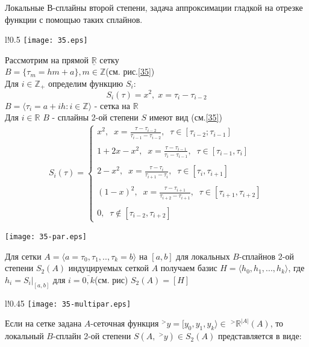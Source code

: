 \documentclass[__main__.tex]{subfiles}
\begin{document}
Локальные В-сплайны второй степени, задача аппроксимации гладкой на отрезке функции с помощью таких сплайнов.\\

\begin{wrapfigure}{l!}{0.5\linewidth}
	\texttt{[image: 35.eps]}
	\label{35}
	\caption{ }
\end{wrapfigure}
Рассмотрим на прямой $\underline{\mathbb{R}}$ сетку\\ $B = \{\tau_m = hm + a\}, m \in \mathbb{Z}$(см. рис.\ref{35})\\
Для $i \in \mathbb{Z}_+$ определим функцию $S_i$:
$$
S_i(\tau) = x^2, \; x = \tau_i - \tau_{i-2}
$$
$B = \langle\tau_i = a + ih: i \in \mathbb{Z}\rangle$ - сетка на  $\mathbb{R}$\\
Для $i \in \mathbb{R}$ $B$ - сплайны 2-ой степени $S$ имеют вид (см.\ref{35})
\begin{gather*}
	S_i(\tau) = 
	\begin{cases}
		x^2, \;\; x = \frac{\tau - \tau_{i-2}}{\tau_{i-1} - \tau_{i-2}}, \;\; \tau \in [\tau_{i-2}; \tau_{i-1}]\\\\
		1 + 2x - x^2, \;\; x = \frac{\tau - \tau_{i-1}}{\tau_i - \tau_{i-1}}, \;\; \tau \in [\tau_{i-1}, \tau_i]\\\\
		2 - x^2, \;\; x = \frac{\tau - \tau_{i}}{\tau_{i+1} - \tau_{i}}, \;\; \tau \in [\tau_{i}, \tau_{i+1}]\\\\
		(1 - x)^2, \;\; x = \frac{\tau - \tau_{i+1}}{\tau_{i+2} - \tau_{i+1}}, \;\; \tau \in [\tau_{i+1}, \tau_{i+2}]\\\\
		0, \;\; \tau \notin [\tau_{i-2}, \tau_{i+2}]
	\end{cases}
\end{gather*}
\begin{center}
	\texttt{[image: 35-par.eps]}
	\label{35-par}
\end{center}
Для сетки $A = \langle a = \tau_0, \tau_1, .., \tau_k = b\rangle$ на $[a, b]$ для локальных $B$-сплайнов 2-ой степени $S_2(A)$ индуцируемых сеткой $A$ получаем базис $H = \langle h_0, h_1, ..., h_k \rangle$, где $h_i = S_i|_{[a, b]}$ для $i = \overline{0, k}$(см. рис) $S_2(A) = [H]$
\newpage
\begin{wrapfigure}[13]{l!}{0.45\linewidth}
	\texttt{[image: 35-multipar.eps]}
	\label{35-multipar}
\end{wrapfigure}
Если на сетке задана $Α$-сеточная функция $^>y = [y_0, y_1, y_k\rangle \in\; ^> \mathbb{R}^{|A|}(A)$, то локальный $B$-сплайн 2-ой степени $S(A, \;^>y) \in S_2(A)$ представляется в виде:
\end{document}
